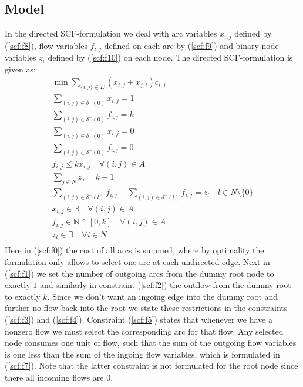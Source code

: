 \documentclass[11pt]{article}
\begin{document}
\subsection{Model}
In the directed SCF-formulation we deal with arc variables $x_{i,j}$ defined by (\ref{scf:f8}), flow variables $f_{i,j}$ defined on each arc by (\ref{scf:f9}) and binary node variables $z_i$ defined by (\ref{scf:f10}) on each node. The directed SCF-formulation is given as:
\begin{gather}
  \min\sum\limits_{\{i,j\}\in E}(x_{i,j}+ x_{j,i})c_{i,j} \label{scf:f0}\\
  \sum\limits_{(i,j)\in \delta^+(0) } x_{i,j} =1 \label{scf:f1}\\
  \sum\limits_{(i,j)\in \delta^+(0) } f_{i,j} =k \label{scf:f2}\\
  \sum\limits_{(i,j)\in \delta^-(0) } x_{i,j} =0 \label{scf:f3}\\
  \sum\limits_{(i,j)\in \delta^-(0) } f_{i,j} =0 \label{scf:f4}\\
  f_{i,j} \leq kx_{i,j} \quad \forall (i,j)\in A\label{scf:f5}\\
  \sum\limits_{j\in N} z_j = k+1\label{scf:f6}\\
  \sum\limits_{(i,j)\in \delta^-(l) } f_{i,j} - \sum\limits_{(i,j)\in \delta^+(l) } f_{i,j} = z_l \quad l\in N \setminus \{0\}\label{scf:f7}\\
  x_{i,j} \in \mathbb{B} \quad \forall (i,j)\in A\label{scf:f8}\\
  f_{i,j} \in \mathbb{N}\cap[0,k] \quad \forall (i,j)\in A\label{scf:f9}\\
  z_{i} \in \mathbb{B} \quad \forall i \in N\label{scf:f10}\\
\end{gather}
Here in (\ref{scf:f0}) the cost of all arcs is summed, where by optimality the formulation only allows to select one arc at each undirected edge. Next in (\ref{scf:f1}) we set the number of outgoing arcs from the dummy root node to exactly $1$ and similarly in constraint (\ref{scf:f2}) the outflow from the dummy root to exactly $k$. Since we don't want an ingoing edge into the dummy root and further no flow back into the root we state these restrictions in the constraints (\ref{scf:f3}) and (\ref{scf:f4}). Constraint (\ref{scf:f5}) states that whenever we have a nonzero flow we must select the corresponding arc for that flow. Any selected node consumes one unit of flow, such that the sum of the outgoing flow variables is one less than the sum of the ingoing flow variables, which is formulated in (\ref{scf:f7}). Note that the latter constraint is not formulated for the root node since there all incoming flows are $0$.
\end{document}
